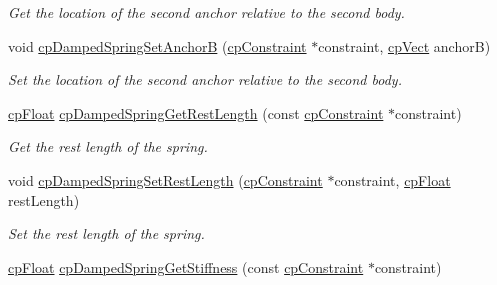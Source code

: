 \begin{DoxyCompactItemize}
\begin{DoxyCompactList}\small\item\em Get the location of the second anchor relative to the second body. \end{DoxyCompactList}\item 
\hypertarget{group__cp_damped_spring_ga0e92193e972e6597dad674076e1306f9}{}void \hyperlink{group__cp_damped_spring_ga0e92193e972e6597dad674076e1306f9}{cp\+Damped\+Spring\+Set\+Anchor\+B} (\hyperlink{structcp_constraint}{cp\+Constraint} $\ast$constraint, \hyperlink{structcp_vect}{cp\+Vect} anchor\+B)\label{group__cp_damped_spring_ga0e92193e972e6597dad674076e1306f9}

\begin{DoxyCompactList}\small\item\em Set the location of the second anchor relative to the second body. \end{DoxyCompactList}\item 
\hypertarget{group__cp_damped_spring_gaffeda8fa023bbe0233b22aa7101e9634}{}\hyperlink{group__basic_types_gac1ed65573e035bf892505768c852d8d3}{cp\+Float} \hyperlink{group__cp_damped_spring_gaffeda8fa023bbe0233b22aa7101e9634}{cp\+Damped\+Spring\+Get\+Rest\+Length} (const \hyperlink{structcp_constraint}{cp\+Constraint} $\ast$constraint)\label{group__cp_damped_spring_gaffeda8fa023bbe0233b22aa7101e9634}

\begin{DoxyCompactList}\small\item\em Get the rest length of the spring. \end{DoxyCompactList}\item 
\hypertarget{group__cp_damped_spring_gad02cccceea61079e0c86f127b67cfe01}{}void \hyperlink{group__cp_damped_spring_gad02cccceea61079e0c86f127b67cfe01}{cp\+Damped\+Spring\+Set\+Rest\+Length} (\hyperlink{structcp_constraint}{cp\+Constraint} $\ast$constraint, \hyperlink{group__basic_types_gac1ed65573e035bf892505768c852d8d3}{cp\+Float} rest\+Length)\label{group__cp_damped_spring_gad02cccceea61079e0c86f127b67cfe01}

\begin{DoxyCompactList}\small\item\em Set the rest length of the spring. \end{DoxyCompactList}\item 
\hypertarget{group__cp_damped_spring_gad6f28aed398e9b15ad903eb6119d6700}{}\hyperlink{group__basic_types_gac1ed65573e035bf892505768c852d8d3}{cp\+Float} \hyperlink{group__cp_damped_spring_gad6f28aed398e9b15ad903eb6119d6700}{cp\+Damped\+Spring\+Get\+Stiffness} (const \hyperlink{structcp_constraint}{cp\+Constraint} $\ast$constraint)\label{group__cp_damped_spring_gad6f28aed398e9b15ad903eb6119d6700}


\end{DoxyCompactItemize}
